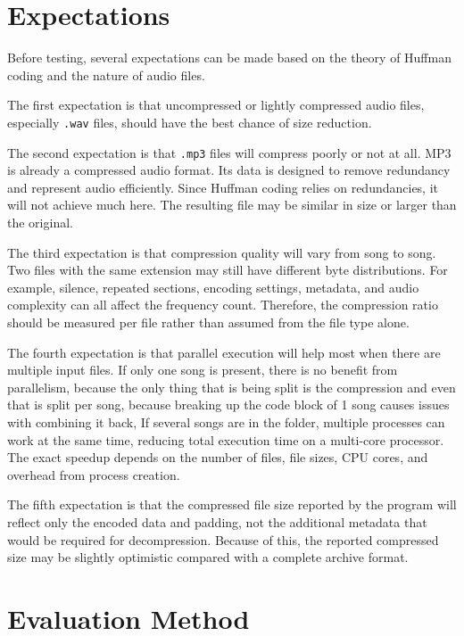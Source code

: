 \documentclass[11pt,a4paper]{article}
\begin{document}
\section{Expectations}

Before testing, several expectations can be made based on the theory of Huffman
coding and the nature of audio files.

The first expectation is that uncompressed or lightly compressed audio files,
especially \texttt{.wav} files, should have the best chance of size reduction.

The second expectation is that \texttt{.mp3} files will compress poorly or not
at all. MP3 is already a compressed audio format. Its data is designed to remove
redundancy and represent audio efficiently. Since Huffman coding relies on redundancies, it will not achieve much here. The resulting file may be similar in size or larger than the
original.

The third expectation is that compression quality will vary from song to song.
Two files with the same extension may still have different byte distributions.
For example, silence, repeated sections, encoding settings, metadata, and audio
complexity can all affect the frequency count. Therefore, the compression ratio
should be measured per file rather than assumed from the file type alone.

The fourth expectation is that parallel execution will help most when there are
multiple input files. If only one song is present, there is no benefit from parallelism, because the only thing that is being split is the compression and even that is split per song, because breaking up the code block of 1 song causes issues with combining it back, If several songs are in
the folder, multiple processes can work at the same time, reducing total
execution time on a multi-core processor. The exact speedup depends on the
number of files, file sizes, CPU cores, and overhead from process creation.

The fifth expectation is that the compressed file size reported by the program
will reflect only the encoded data and padding, not the additional metadata that
would be required for decompression. Because of this, the reported compressed
size may be slightly optimistic compared with a complete archive format.

\section{Evaluation Method}
\end{document}
